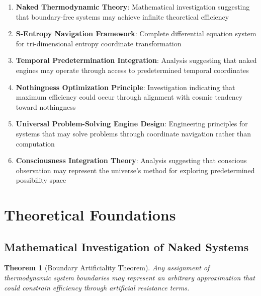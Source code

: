\documentclass[11pt,a4paper]{article}
\newtheorem{theorem}{Theorem}[section]
\theoremstyle{remark}
\begin{document}
\begin{enumerate}
\item \textbf{Naked Thermodynamic Theory}: Mathematical investigation suggesting that boundary-free systems may achieve infinite theoretical efficiency
\item \textbf{S-Entropy Navigation Framework}: Complete differential equation system for tri-dimensional entropy coordinate transformation
\item \textbf{Temporal Predetermination Integration}: Analysis suggesting that naked engines may operate through access to predetermined temporal coordinates
\item \textbf{Nothingness Optimization Principle}: Investigation indicating that maximum efficiency could occur through alignment with cosmic tendency toward nothingness
\item \textbf{Universal Problem-Solving Engine Design}: Engineering principles for systems that may solve problems through coordinate navigation rather than computation
\item \textbf{Consciousness Integration Theory}: Analysis suggesting that conscious observation may represent the universe's method for exploring predetermined possibility space
\end{enumerate}

\section{Theoretical Foundations}

\subsection{Mathematical Investigation of Naked Systems}

\begin{theorem}[Boundary Artificiality Theorem]
Any assignment of thermodynamic system boundaries may represent an arbitrary approximation that could constrain efficiency through artificial resistance terms.
\end{theorem}
\end{document}
